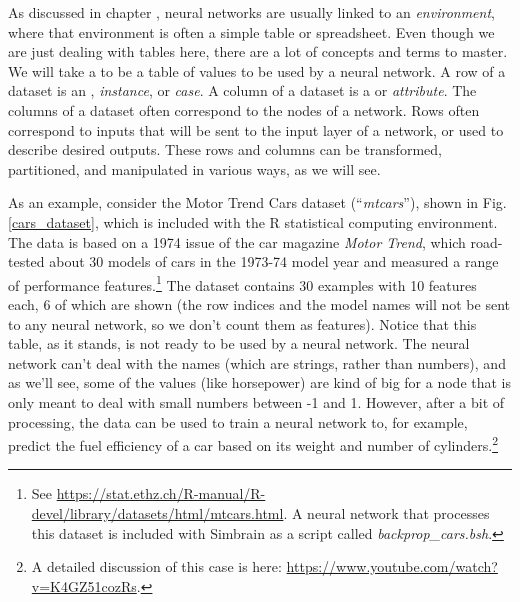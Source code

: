 As discussed in chapter , neural networks are usually linked to an \emph{environment}, where that environment is often a simple table or spreadsheet. Even though we are just dealing with tables here, there are a lot of concepts and terms to master. We will take a   to be a table of values to be used by a neural network. A row of a dataset is an , \emph{instance}, or \emph{case}. A column of a dataset is a  or \emph{attribute}. The columns of a dataset often correspond to the nodes of a network. Rows often correspond to inputs that will be sent to the input layer of a network, or used to describe desired outputs. These rows and columns can be transformed, partitioned, and manipulated in various ways, as we will see. 
  
As an example, consider the Motor Trend Cars dataset  (``\emph{mtcars}''),  shown in Fig. \ref{cars_dataset}, which is included with the R statistical computing environment. The data is based on a 1974 issue of the car magazine \emph{Motor Trend}, which road-tested about 30 models of cars in the 1973-74 model year and measured a range of performance features.\footnote{See \url{https://stat.ethz.ch/R-manual/R-devel/library/datasets/html/mtcars.html}. A neural network that processes this dataset is included with Simbrain as a script called \emph{backprop\_cars.bsh}. } The dataset contains 30 examples with 10 features each, 6 of which are shown (the row indices and the model names will not be sent to any neural network, so we don't count them as features). Notice that this table, as it stands, is not ready to be used by a neural network. The neural network can't deal with the names (which are strings, rather than numbers), and as we'll see, some of the values (like horsepower) are kind of big for a node that is only meant to deal with small numbers between -1 and 1. However, after a bit of processing, the data can be used to train a neural network to, for example, predict the fuel efficiency of a car based on its weight and number of cylinders.\footnote{A detailed discussion of this case is here: \url{https://www.youtube.com/watch?v=K4GZ51cozRs}.}

